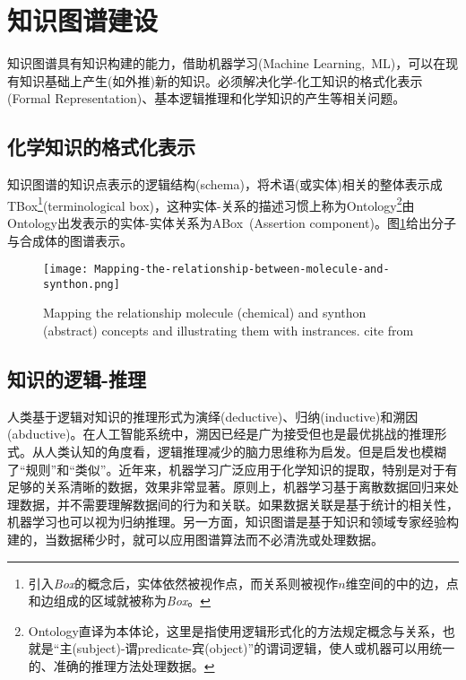 \section{知识图谱建设}
知识图谱具有知识构建的能力，借助机器学习\textrm{(Machine Learning,~ML)}，可以在现有知识基础上产生(如外推)新的知识。必须解决化学-化工知识的格式化表示\textrm{(Formal Representation)}、基本逻辑推理和化学知识的产生等相关问题。
\subsection{化学知识的格式化表示}
知识图谱的知识点表示的逻辑结构\textrm{(schema)}，将术语(或实体)相关的整体表示成\textrm{TBox}\footnote{引入\textit{Box}的概念后，实体依然被视作点，而关系则被视作$n$维空间的中的边，点和边组成的区域就被称为\textit{Box}。}\textrm{(terminological box)}，这种实体-关系的描述习惯上称为\textrm{Ontology}\footnote{\textrm{Ontology}直译为本体论，这里是指使用逻辑形式化的方法规定概念与关系，也就是“主\textrm{(subject)}-谓\textrm{predicate}-宾\textrm{(object)}”的谓词逻辑，使人或机器可以用统一的、准确的推理方法处理数据。}由\textrm{Ontology}出发表示的实体-实体关系为\textrm{ABox~(Assertion component)}。图\ref{Fig:Mapping-relationship-molecule-synthon}给出分子与合成体的图谱表示。 
\begin{figure}[h!]
\centering
\texttt{[image: Mapping-the-relationship-between-molecule-and-synthon.png]}
\caption{\small\textrm{Mapping the relationship molecule (chemical) and synthon (abstract) concepts and illustrating them with instrances. cite from\cite{ACR56-128_2023}}}%
\label{Fig:Mapping-relationship-molecule-synthon}
\end{figure}

\subsection{知识的逻辑-推理}
人类基于逻辑对知识的推理形式为演绎\textrm{(deductive)}、归纳\textrm{(inductive)}和溯因\textrm{(abductive)}。在人工智能系统中，溯因已经是广为接受但也是最优挑战的推理形式。从人类认知的角度看，逻辑推理减少的脑力思维称为启发。但是启发也模糊了“规则”和“类似”。近年来，机器学习广泛应用于化学知识的提取，特别是对于有足够的关系清晰的数据，效果非常显著。原则上，机器学习基于离散数据回归来处理数据，并不需要理解数据间的行为和关联。如果数据关联是基于统计的相关性，机器学习也可以视为归纳推理。另一方面，知识图谱是基于知识和领域专家经验构建的，当数据稀少时，就可以应用图谱算法而不必清洗或处理数据。

